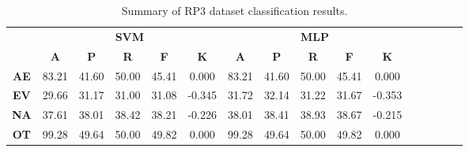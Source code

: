 \begin{landscape}
\begin{table}[htbp]
\footnotesize
\centering
\caption{Summary of RP3 dataset classification results.}
\label{tab:base_female}
\begin{tabular}{|c|c|c|c|c|c|c|c|c|c|c|c|c|c|c|c|}
\hline
\multirow{2}{*}{}	& \multicolumn{5}{c|}{\textbf{SVM}}												& \multicolumn{5}{c|}{\textbf{MLP}}												\\ \cline{2-11} 
					& \textbf{A}	& \textbf{P}	& \textbf{R}	& \textbf{F}	& \textbf{K}	& \textbf{A}	& \textbf{P}	& \textbf{R}	& \textbf{F}	& \textbf{K}	\\ \hline
\textbf{AE}			& 83.21			& 41.60			& 50.00			& 45.41			& 0.000			& 83.21			& 41.60			& 50.00			& 45.41			& 0.000			\\ \hline
\textbf{EV}			& 29.66			& 31.17			& 31.00			& 31.08			& -0.345			& 31.72			& 32.14			& 31.22			& 31.67			& -0.353			\\ \hline
\textbf{NA}			& 37.61			& 38.01			& 38.42			& 38.21			& -0.226			& 38.01			& 38.41			& 38.93			& 38.67			& -0.215			\\ \hline
\textbf{OT}			& 99.28			& 49.64			& 50.00			& 49.82			& 0.000			& 99.28			& 49.64			& 50.00			& 49.82			& 0.000			\\ \hline
\end{tabular}
\end{table}
\end{landscape}